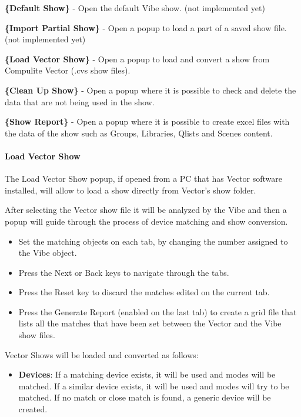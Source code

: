 \documentclass[
]{article}
\providecommand{\tightlist}{%
  \setlength{\itemsep}{0pt}\setlength{\parskip}{0pt}}
\begin{document}
\textbf{\{Default Show\}} - Open the default Vibe show. { (not implemented yet) }

\textbf{\{Import Partial Show\}} - Open a popup to load a part of a saved show file. { (not implemented yet) }

\textbf{\{Load Vector Show\}} - Open a popup to load and convert a show from Compulite Vector (.cvs show files).

\textbf{\{Clean Up Show\}} - Open a popup where it is possible to check and delete the data that are not being used in the show.

\textbf{\{Show Report\}} - Open a popup where it is possible to create excel files with the data of the show such as Groups, Libraries, Qlists and Scenes content.

\hypertarget{load-vector-show}{%
\paragraph{Load Vector Show}\label{load-vector-show}}

The Load Vector Show popup, if opened from a PC that has Vector software installed, will allow to load a show directly from Vector's show folder.

After selecting the Vector show file it will be analyzed by the Vibe and then a popup will guide through the process of device matching and show conversion.

\begin{itemize}
\item
  Set the matching objects on each tab, by changing the number assigned to the Vibe object.
\item
  Press the Next or Back keys to navigate through the tabs.
\item
  Press the Reset key to discard the matches edited on the current tab.
\item
  Press the Generate Report (enabled on the last tab) to create a grid file that lists all the matches that have been set between the Vector and the Vibe show files.
\end{itemize}

Vector Shows will be loaded and converted as follows:

\begin{itemize}
\tightlist
\item
  \textbf{Devices}: If a matching device exists, it will be used and modes will be matched. If a similar device exists, it will be used and modes will try to be matched. If no match or close match is found, a generic device will be created.
\end{itemize}
\end{document}
